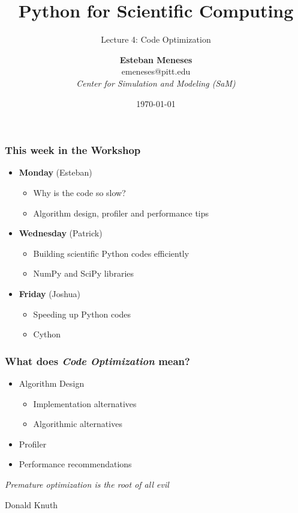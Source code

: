 \documentclass[xcolor=table,10pt,final]{beamer}
\begin{document}
\lstset{language=Python}

\title{Python for Scientific Computing}
\subtitle{Lecture 4: Code Optimization}
\author{{\bf Esteban Meneses}\\emeneses@pitt.edu\\{\em Center for Simulation and Modeling (SaM)}}
\date{\today}
\frame{\titlepage}

\ifx \audience \undefined
\begin{frame}
	\frametitle{This week in the Workshop}
	\begin{itemize}
		\item {\bf Monday} (Esteban)
		\begin{itemize} 
			\item Why is the code so slow?
			\item Algorithm design, profiler and performance tips
		\end{itemize}
		\item {\bf Wednesday} (Patrick)
		\begin{itemize} 
			\item Building scientific Python codes efficiently 
			\item NumPy and SciPy libraries
		\end{itemize}
		\item {\bf Friday} (Joshua)
		\begin{itemize} 
			\item Speeding up Python codes
			\item Cython
		\end{itemize}
	\end{itemize}
\end{frame}
\else
\fi

\begin{frame}
	\frametitle{What does \emph{Code Optimization} mean?}
	\begin{itemize}
		\item Algorithm Design
		\begin{itemize}
			\item Implementation alternatives
			\item Algorithmic alternatives
		\end{itemize}
		\item Profiler
		\item Performance recommendations
	\end{itemize}
\end{frame}

\begin{frame}
\hfill \emph{Premature optimization is the root of all evil}

\hfill Donald Knuth
\end{frame}
\end{document}
